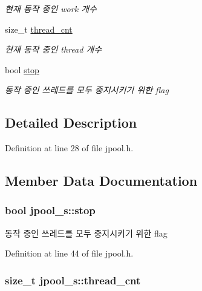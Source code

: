 \begin{DoxyCompactItemize}
\begin{DoxyCompactList}\small\item\em 현재 동작 중인 work 개수 \end{DoxyCompactList}\item 
size\-\_\-t \hyperlink{structjpool__s_a123842c9941946bd2e9e9f6c930022c6}{thread\-\_\-cnt}
\begin{DoxyCompactList}\small\item\em 현재 동작 중인 thread 개수 \end{DoxyCompactList}\item 
bool \hyperlink{structjpool__s_acb5a4cd9d4c371aeac1fb508b1e866dd}{stop}
\begin{DoxyCompactList}\small\item\em 동작 중인 쓰레드를 모두 중지시키기 위한 flag \end{DoxyCompactList}\end{DoxyCompactItemize}


\subsection{Detailed Description}


Definition at line 28 of file jpool.\-h.



\subsection{Member Data Documentation}
\hypertarget{structjpool__s_acb5a4cd9d4c371aeac1fb508b1e866dd}{
\subsubsection[{stop}]{\setlength{\rightskip}{0pt plus 5cm}bool jpool\-\_\-s\-::stop}}\label{structjpool__s_acb5a4cd9d4c371aeac1fb508b1e866dd}


동작 중인 쓰레드를 모두 중지시키기 위한 flag 



Definition at line 44 of file jpool.\-h.

\hypertarget{structjpool__s_a123842c9941946bd2e9e9f6c930022c6}{
\subsubsection[{thread\-\_\-cnt}]{\setlength{\rightskip}{0pt plus 5cm}size\-\_\-t jpool\-\_\-s\-::thread\-\_\-cnt}}\label{structjpool__s_a123842c9941946bd2e9e9f6c930022c6}


